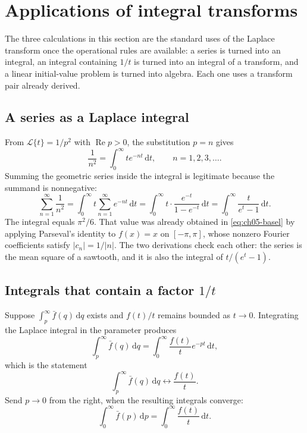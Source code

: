 \section{Applications of integral transforms}

The three calculations in this section are the standard uses of the Laplace transform once the operational rules are available: a series is turned into an integral, an integral containing $1/t$ is turned into an integral of a transform, and a linear initial-value problem is turned into algebra. Each one uses a transform pair already derived.

\subsection{A series as a Laplace integral}

From $\mathcal{L}\{t\}=1/p^2$ with $\operatorname{Re}p>0$, the substitution $p=n$ gives
\begin{equation}
\frac{1}{n^2}=\int_0^{\infty}t e^{-nt}\,\mathrm{d}t,
\qquad n=1,2,3,\ldots.
\end{equation}
Summing the geometric series inside the integral is legitimate because the summand is nonnegative:
\begin{equation}
\sum_{n=1}^{\infty}\frac{1}{n^2}
=\int_0^{\infty}t\sum_{n=1}^{\infty}e^{-nt}\,\mathrm{d}t
=\int_0^{\infty}t\cdot\frac{e^{-t}}{1-e^{-t}}\,\mathrm{d}t
=\int_0^{\infty}\frac{t}{e^t-1}\,\mathrm{d}t.
\end{equation}
The integral equals $\pi^2/6$. That value was already obtained in \eqref{eq:ch05-basel} by applying Parseval's identity to $f(x)=x$ on $[-\pi,\pi]$, whose nonzero Fourier coefficients satisfy $|c_n|=1/|n|$. The two derivations check each other: the series is the mean square of a sawtooth, and it is also the integral of $t/(e^t-1)$.

\subsection{Integrals that contain a factor $1/t$}

Suppose $\int_p^{\infty}\bar f(q)\,\mathrm{d}q$ exists and $f(t)/t$ remains bounded as $t\to 0$. Integrating the Laplace integral in the parameter produces
\begin{equation}
\int_p^{\infty}\bar f(q)\,\mathrm{d}q
=\int_0^{\infty}\frac{f(t)}{t}e^{-pt}\,\mathrm{d}t,
\end{equation}
which is the statement
\begin{equation}
\int_p^{\infty}\bar f(q)\,\mathrm{d}q\longleftrightarrow\frac{f(t)}{t}.
\label{eq:ch06-one-over-t}
\end{equation}
Send $p\to 0$ from the right, when the resulting integrals converge:
\begin{equation}
\int_0^{\infty}\bar f(p)\,\mathrm{d}p=\int_0^{\infty}\frac{f(t)}{t}\,\mathrm{d}t.
\label{eq:ch06-integral-zero}
\end{equation}


